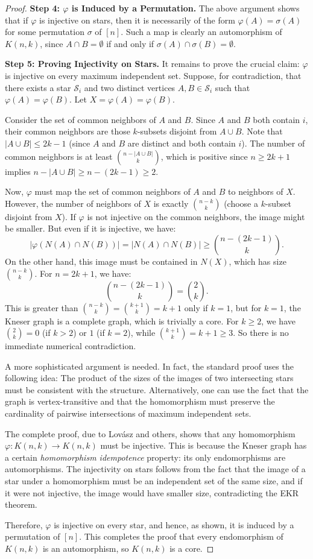 \documentclass[12pt,a4paper,openany]{book}
\begin{document}
\begin{proof}
\textbf{Step 4: $\varphi$ is Induced by a Permutation.}
The above argument shows that if $\varphi$ is injective on stars, then it is necessarily of the form $\varphi(A) = \sigma(A)$ for some permutation $\sigma$ of $[n]$. Such a map is clearly an automorphism of $K(n,k)$, since $A \cap B = \emptyset$ if and only if $\sigma(A) \cap \sigma(B) = \emptyset$.

\textbf{Step 5: Proving Injectivity on Stars.}
It remains to prove the crucial claim: $\varphi$ is injective on every maximum independent set. Suppose, for contradiction, that there exists a star $\mathcal{S}_i$ and two distinct vertices $A, B \in \mathcal{S}_i$ such that $\varphi(A) = \varphi(B)$. Let $X = \varphi(A) = \varphi(B)$.

Consider the set of common neighbors of $A$ and $B$. Since $A$ and $B$ both contain $i$, their common neighbors are those $k$-subsets disjoint from $A \cup B$. Note that $|A \cup B| \le 2k-1$ (since $A$ and $B$ are distinct and both contain $i$). The number of common neighbors is at least $\binom{n - |A \cup B|}{k}$, which is positive since $n \ge 2k+1$ implies $n - |A \cup B| \ge n - (2k-1) \ge 2$.

Now, $\varphi$ must map the set of common neighbors of $A$ and $B$ to neighbors of $X$. However, the number of neighbors of $X$ is exactly $\binom{n-k}{k}$ (choose a $k$-subset disjoint from $X$). If $\varphi$ is not injective on the common neighbors, the image might be smaller. But even if it is injective, we have:
\[
|\varphi(N(A) \cap N(B))| = |N(A) \cap N(B)| \ge \binom{n - (2k-1)}{k}.
\]
On the other hand, this image must be contained in $N(X)$, which has size $\binom{n-k}{k}$. For $n = 2k+1$, we have:
\[
\binom{n - (2k-1)}{k} = \binom{2}{k}.
\]
This is greater than $\binom{n-k}{k} = \binom{k+1}{k} = k+1$ only if $k=1$, but for $k=1$, the Kneser graph is a complete graph, which is trivially a core. For $k \ge 2$, we have $\binom{2}{k} = 0$ (if $k>2$) or $1$ (if $k=2$), while $\binom{k+1}{k} = k+1 \ge 3$. So there is no immediate numerical contradiction.

A more sophisticated argument is needed. In fact, the standard proof uses the following idea: The product of the sizes of the images of two intersecting stars must be consistent with the structure. Alternatively, one can use the fact that the graph is vertex-transitive and that the homomorphism must preserve the cardinality of pairwise intersections of maximum independent sets.

The complete proof, due to Lovász and others, shows that any homomorphism $\varphi: K(n,k) \to K(n,k)$ must be injective. This is because the Kneser graph has a certain \emph{homomorphism idempotence} property: its only endomorphisms are automorphisms. The injectivity on stars follows from the fact that the image of a star under a homomorphism must be an independent set of the same size, and if it were not injective, the image would have smaller size, contradicting the EKR theorem.

Therefore, $\varphi$ is injective on every star, and hence, as shown, it is induced by a permutation of $[n]$. This completes the proof that every endomorphism of $K(n,k)$ is an automorphism, so $K(n,k)$ is a core.
\end{proof}
\end{document}
